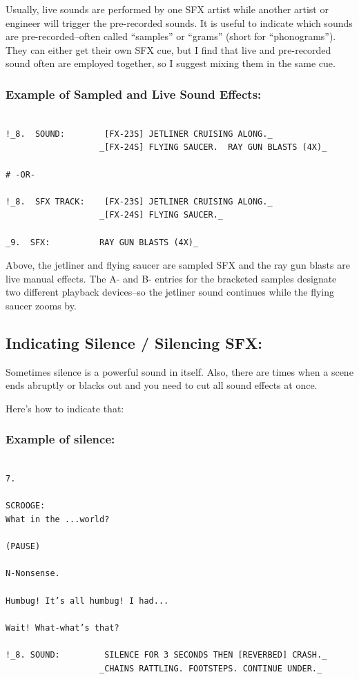 \documentclass[openleft,oneside,showtrims]{memoir}
\begin{document}
Usually, live sounds are performed by one SFX artist while another artist or engineer will trigger the pre-recorded sounds. It is useful to indicate which sounds are pre-recorded--often called ``samples'' or ``grams'' (short for ``phonograms''). They can either get their own SFX cue, but I find that live and pre-recorded sound often are employed together, so I suggest mixing them in the same cue.

\subsubsection*{Example of Sampled and Live Sound Effects:}
\label{sec:org2d233f5}

\lstset{language=fountain,label= ,caption= ,captionpos=b,numbers=none}
\begin{lstlisting}

!_8.  SOUND:        [FX-23S] JETLINER CRUISING ALONG._
                   _[FX-24S] FLYING SAUCER.  RAY GUN BLASTS (4X)_

# -OR-

!_8.  SFX TRACK:    [FX-23S] JETLINER CRUISING ALONG._
                   _[FX-24S] FLYING SAUCER._

_9.  SFX:          RAY GUN BLASTS (4X)_

\end{lstlisting}

Above, the jetliner and flying saucer are sampled SFX and the ray gun blasts are live manual effects. The A- and B- entries for the bracketed samples designate two different playback devices--so the jetliner sound continues while the flying saucer zooms by.

\subsection{Indicating Silence / Silencing SFX:}
\label{sec:org5582c60}
Sometimes silence is a powerful sound in itself. Also, there are times when a scene ends abruptly or blacks out and you need to cut all sound effects at once. 

Here's how to indicate that:

\subsubsection*{Example of silence:}
\label{sec:org9caedbb}

\lstset{language=fountain,label= ,caption= ,captionpos=b,numbers=none}
\begin{lstlisting}

7.

SCROOGE:
What in the ...world?
  
(PAUSE)
  
N-Nonsense.
  
Humbug! It’s all humbug! I had...
  
Wait! What-what’s that?

!_8. SOUND:         SILENCE FOR 3 SECONDS THEN [REVERBED] CRASH._
                   _CHAINS RATTLING. FOOTSTEPS. CONTINUE UNDER._

\end{lstlisting}
\end{document}
